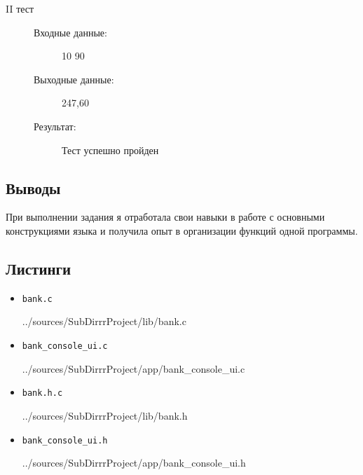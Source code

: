 \documentclass[12pt,a4paper]{report}
\begin{document}
\begin{enumerate}
\begin{description}
\item[II тест]
\hspace{\parindent}
\begin{flushleft}
\begin{description}
\item[Входные данные:] 10 90
\item[Выходные данные:] 247,60
\item[Результат:] Тест успешно пройден
\end{description}
\end{flushleft}
\end{description}

\end{enumerate}

\subsection{Выводы}
\hspace{\parindent}
При выполнении задания я отработала свои навыки в работе с основными конструкциями языка и получила опыт в организации функций одной программы.
\subsection*{Листинги}
\begin{itemize}
\item[] \verb-bank.c-

{../sources/SubDirrrProject/lib/bank.c}
\item[] \verb-bank_console_ui.c-

{../sources/SubDirrrProject/app/bank_console_ui.c}
\item[] \verb-bank.h.c-

{../sources/SubDirrrProject/lib/bank.h}
\item[] \verb-bank_console_ui.h-

{../sources/SubDirrrProject/app/bank_console_ui.h}
\end{itemize}

%
\end{document}
